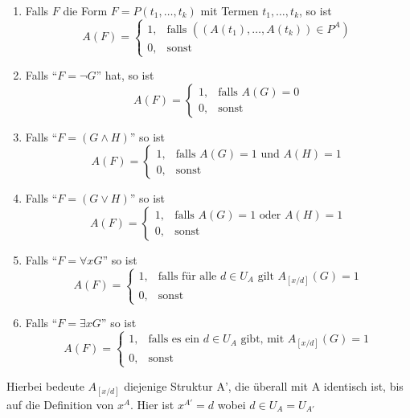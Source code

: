 \documentclass[a4paper]{scrartcl}
\begin{document}
\begin{enumerate}
\item Falls $F$ die Form $F=P(t_1, \ldots, t_k)$ mit Termen $t_1, \ldots, t_k$, so ist \[A(F)=
	\begin{cases}
	1, & \text{falls } ((A(t_1), \ldots, A(t_k)) \in P^A) \\
	0, & \text{sonst }
	\end{cases}\]
\item Falls "`$F = \neg G$"' hat, so ist \[ A(F)=
	\begin{cases}
	1, & \text{falls $A(G)=0$} \\
	0, & \text{sonst}
	\end{cases}\]
\item Falls "`$F=(G \wedge H)$"' so ist \[ A(F)=
	\begin{cases}
	1, & \text{falls $A(G)=1$ und $A(H)=1$} \\
	0, & \text{sonst}
	\end{cases}\]
\item Falls "`$F=(G \vee H)$"' so ist \[ A(F)=
	\begin{cases}
	1, & \text{falls $A(G)=1$ oder $A(H)=1$} \\
	0, & \text{sonst}
	\end{cases}\]
\item Falls "`$F=\forall xG$"' so ist \[ A(F)=
	\begin{cases}
	1, & \text{falls für alle $d \in U_A$ gilt $A_{[x/d]}(G)=1$} \\
	0, & \text{sonst}
	\end{cases}\]
\item Falls "`$F=\exists xG$"' so ist \[ A(F)=
	\begin{cases}
	1, & \text{falls es ein $d \in U_A$ gibt, mit $A_{[x/d]}(G)=1$}\\
	0, & \text{sonst}
	\end{cases}\]
\end{enumerate}

Hierbei bedeute $A_{[x/d]}$ diejenige Struktur A', die überall mit A identisch ist, bis auf die Definition von $x^A$. Hier ist $x^{A'}=d$ wobei $d \in U_A = U_{A'}$
\end{document}
